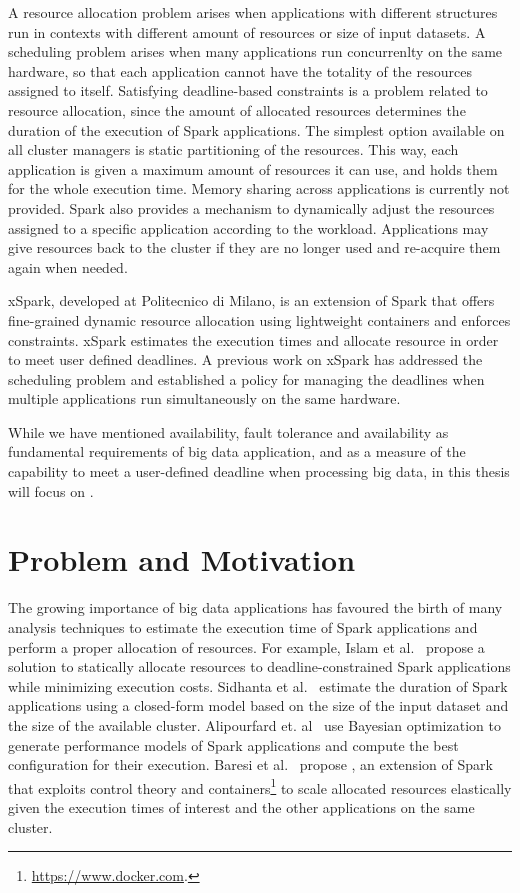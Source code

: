 A resource allocation problem arises when applications with different structures run in contexts with different amount of resources or size of input datasets. A scheduling problem arises when many applications run concurrenlty on the same hardware, so that each application cannot have the totality of the resources assigned to itself. Satisfying deadline-based \qos constraints is a problem related to resource allocation, since the amount of allocated resources determines the duration of the execution of Spark applications. The simplest option available on all cluster managers is static partitioning of the resources. This way, each application is given a maximum amount of resources it can use, and holds them for the whole execution time. Memory sharing across applications is currently not provided. Spark also provides a mechanism to dynamically adjust the resources assigned to a specific application according to the workload. Applications may give resources back to the cluster if they are no longer used and re-acquire them again when needed.

xSpark, developed at Politecnico di Milano, is an extension of Spark that offers fine-grained dynamic resource allocation using lightweight containers and enforces \qos constraints. xSpark estimates the execution times and allocate resource in order to meet user defined deadlines. A previous work on xSpark has addressed the scheduling problem and established a policy for managing the deadlines when multiple applications run simultaneously on the same hardware.

While we have mentioned availability, fault tolerance and availability as fundamental requirements of big data application, and \qos as a measure of the capability to meet a user-defined deadline when processing big data, in this thesis will focus on \qos.

\section{Problem and Motivation}\label{sec:problem_motivation}
The growing importance of big data applications has favoured the birth of many analysis techniques to estimate the execution time of Spark applications and perform a proper allocation of resources. For example, Islam et al.~\cite{dSpark} propose a solution to statically allocate resources to deadline-constrained Spark applications while minimizing execution costs. Sidhanta et al.~\cite{Sidhanta2016} estimate the duration of Spark applications using a closed-form model based on the size of the input dataset and the size of the available cluster. Alipourfard et. al~\cite{Alipourfard} use Bayesian optimization to generate performance models of Spark applications and compute the best configuration for their execution.  Baresi et al.~\cite{xsparkreport, Quattrocchi2018} propose \cSpark, an extension of Spark that exploits control theory and containers\footnote{\url{https://www.docker.com}.} to scale allocated resources elastically given the execution times of interest and the other applications  on the same cluster.

